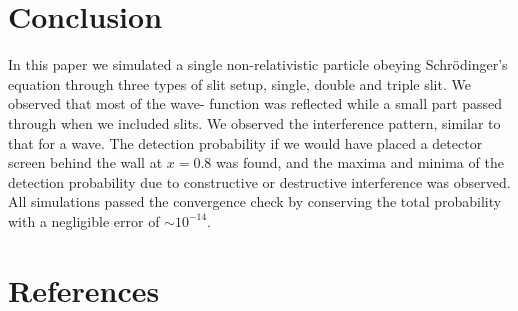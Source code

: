 \documentclass[english,notitlepage,reprint,nofootinbib]{revtex4-2}  %
\begin{document}
	\section{Conclusion}\label{sec:conclusion}
	\noindent
	In this paper we simulated a single non-relativistic particle obeying 
	Schrödinger's equation through three types of slit setup, single, double
	and triple slit. We observed that most of the wave-
	function was reflected while a small part passed through when we included slits. We observed the 
	interference pattern, similar to that for a wave. The detection probability if we would have placed 
	a detector screen behind the wall at $x=0.8$ was found, and the maxima and 
	minima of the detection probability due to constructive or destructive interference was observed. All simulations passed the convergence check by conserving the total 
	probability with a negligible error of $\sim 10^{-14}$. \\
	
	
	
	\onecolumngrid
	\section*{References}
	
	
	
\end{document}
